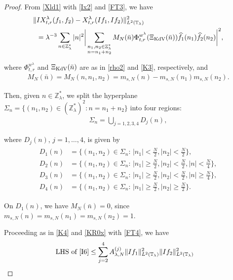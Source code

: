 \documentclass[letterpaper, 11pt,  reqno]{amsart}
\newcommand{\1}{\hspace{0.5mm}\text{I}\hspace{0.5mm}}
\newcommand{\noi}{\noindent}
\newcommand{\Z}{\mathbb{Z}}
\newcommand{\T}{\mathbb{T}}
\newcommand{\ld}{\lambda}
\newcommand{\Si}{\Sigma}
\newcommand{\ft}{\widehat}
\newcommand{\KDV}{\text{\rm KdV} }
\numberwithin{equation}{section}
\numberwithin{theorem}{section}
\begin{document}
\begin{proof}

From \eqref{Xld1} with \eqref{Ix2} and \eqref{FT3}, we have 
\begin{align}
\begin{aligned}
\|  & I X^{\ld}_{t,r}( f _1, f _2) - X^{\ld}_{t,r} (I  f_1, I  f_2) \|^2_{L^2(\T_\ld)}\\
&=
\ld^{-3} \sum_{ n\in\Z_{\ld}^*}
|n|^2 \bigg| \sum_{\substack{n_1, n_2 \in\Z_{\ld}^*\\n = n_1+n_2}}
M_N(\bar n)
\Phi^{w^\ld}_{t,r}(\Xi_\KDV(\bar n))
\ft  f _1(n_1) \ft  f _2 (n_2)
\bigg|^2 ,
\end{aligned}
\label{I6}
\end{align}

\noi
where $\Phi^{w^\ld}_{t, r}$ and 
$\Xi_\KDV(\bar n)$
are as in \eqref{rho2} 
 and \eqref{K3}, respectively, 
 and 
\begin{align}
M_N(\bar n)=  M_N(n,n_1, n_2)=  m_{s, N} (n) - m_{s, N} (n_1) m_{s, N}(n_2) .
\label{I6a}
\end{align}


\noi
Then, given $n \in \Z_\ld^*$, 
we split  the hyperplane $\Si_n = \big\{ (n_1, n_2)\in (\Z_\ld^*)^2:
n = n_1+n_2\big\}$ into four regions: 
\begin{align*}
\Si_n 
= \bigcup_{j=1,2,3,4} D_j(n), 
\end{align*}



\noi
where $D_j(n)$,  $j=1,\dots,4$,  is given by 
\begin{align}
\begin{aligned}
D_1(n)&=\Big\{ (n_1, n_2)\in \Si_n :\, |n_1| <  \frac N2, |n_2| <  \frac N2 \Big\}, \\
D_2(n)&=\Big\{(n_1, n_2)\in \Si_n:\, |n_1| \geq \frac N2, |n_2| <  \frac N2, |n|<  \frac N4 \Big\}, \\
D_3(n)&=\Big\{(n_1, n_2)\in \Si_n:\, |n_1| \geq \frac N2, |n_2| <  \frac N2, |n|\geq \frac N4 \Big\}, \\
D_4(n)&=\Big\{(n_1, n_2)\in \Si_n:\, |n_1| \geq \frac N2, |n_2| \geq \frac N2 \Big\}. 
\label{I8}
\end{aligned}
\end{align}


\noi
On $D_1(n)$, we have $M_N(\bar n) = 0$, 
since
$m_{s, N}(n)=m_{s, N}(n_1)=m_{s, N}(n_2)=1$. 

Proceeding as in \eqref{K4} and \eqref{KR0x}
with \eqref{FT4}, 
we have 
\begin{align*}
\text{LHS of \eqref{I6}}
&\leq \sum_{j = 2}^4 
A_{\ld, N}^{(j)} \| I  f_1 \|_{L^2(\T_\ld)}^2 \| I  f_2 \|_{L^2(\T_\ld)}^2
\end{align*}


\end{proof}
\end{document}
